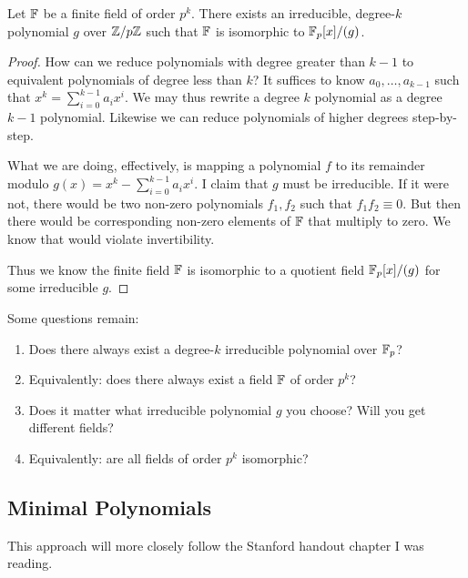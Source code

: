 \begin{theorem}
  Let $\mathbb{F}$ be a finite field of order $p^k$. There exists an
  irreducible, degree-$k$ polynomial $g$ over $\mathbb{Z} / p\mathbb{Z}$ such that $\mathbb{F}$ is
  isomorphic to $\mathbb{F}_p[x]/(g)$.
\end{theorem}

\begin{proof}
  How can we reduce polynomials with degree greater than $k-1$ to
  equivalent polynomials of degree less than $k$? It suffices to know
  $a_0, \ldots, a_{k-1}$ such that $x^k = \sum_{i=0}^{k-1} a_i x^i$. We
  may thus rewrite a degree $k$ polynomial as a degree $k-1$ polynomial.
  Likewise we can reduce polynomials of higher degrees step-by-step.

  What we are doing, effectively, is mapping a polynomial $f$ to its
  remainder modulo $g(x) = x^k - \sum_{i=0}^{k-1} a_i x^i$. I claim that
  $g$ must be irreducible. If it were not, there would be two non-zero
  polynomials $f_1, f_2$ such that $f_1 f_2 \equiv 0$. But then there
  would be corresponding non-zero elements of $\mathbb{F}$ that multiply to
  zero. We know that would violate invertibility.

  Thus we know the finite field $\mathbb{F}$ is isomorphic to a quotient field
  $\mathbb{F}_p[x]/(g)$ for some irreducible $g$.
\end{proof}

\begin{remark}
  Some questions remain:

  \begin{enumerate}
    \item Does there always exist a degree-$k$ irreducible polynomial
    over $\mathbb{F}_p$?

    \item Equivalently: does there always exist a field $\mathbb{F}$ of order
    $p^k$?

    \item Does it matter what irreducible polynomial $g$ you choose?
    Will you get different fields?

    \item Equivalently: are all fields of order $p^k$ isomorphic?
  \end{enumerate}
\end{remark}

\subsection{Minimal Polynomials}

\begin{remark}
  This approach will more closely follow the Stanford handout chapter I
  was reading.
\end{remark}

